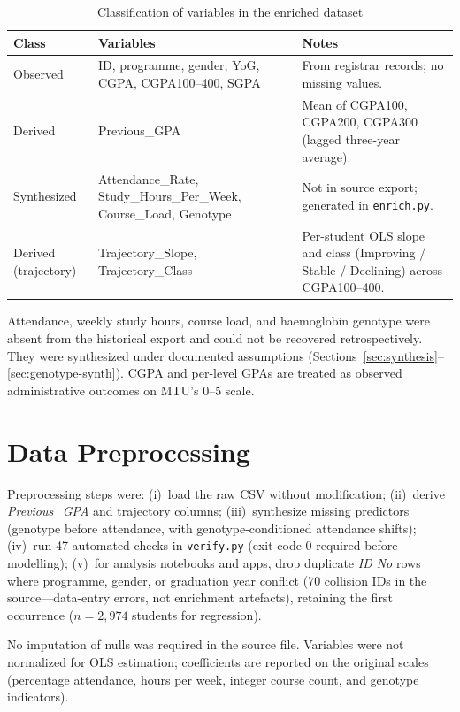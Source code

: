 \documentclass[12pt]{report}
\begin{document}
	\begin{table}[htbp]
		\centering
		\caption{Classification of variables in the enriched dataset}
		\label{tab:data-sources}
		\small
		\begin{tabularx}{\textwidth}{@{}>{\raggedright\arraybackslash}p{2.4cm} >{\raggedright\arraybackslash}p{4.6cm} >{\raggedright\arraybackslash}X@{}}
			\hline
			\textbf{Class} & \textbf{Variables} & \textbf{Notes} \\
			\hline
			Observed & ID, programme, gender, YoG, CGPA, CGPA100--400, SGPA & From registrar records; no missing values. \\
			Derived & Previous\_GPA & Mean of CGPA100, CGPA200, CGPA300 (lagged three-year average). \\
			Synthesized & Attendance\_Rate, Study\_Hours\_Per\_Week, Course\_Load, Genotype & Not in source export; generated in \texttt{enrich.py}. \\
			Derived (trajectory) & Trajectory\_Slope, Trajectory\_Class & Per-student OLS slope and class (Improving / Stable / Declining) across CGPA100--400. \\
			\hline
		\end{tabularx}
	\end{table}
	
	Attendance, weekly study hours, course load, and haemoglobin genotype were absent from the historical export and could not be recovered retrospectively. They were synthesized under documented assumptions (Sections~\ref{sec:synthesis}--\ref{sec:genotype-synth}). CGPA and per-level GPAs are treated as observed administrative outcomes on MTU's 0--5 scale.
	
	\section{Data Preprocessing}
	Preprocessing steps were: (i)~load the raw CSV without modification; (ii)~derive \textit{Previous\_GPA} and trajectory columns; (iii)~synthesize missing predictors (genotype before attendance, with genotype-conditioned attendance shifts); (iv)~run 47 automated checks in \texttt{verify.py} (exit code 0 required before modelling); (v)~for analysis notebooks and apps, drop duplicate \textit{ID No} rows where programme, gender, or graduation year conflict (70 collision IDs in the source---data-entry errors, not enrichment artefacts), retaining the first occurrence ($n = 2{,}974$ students for regression).
	
	No imputation of nulls was required in the source file. Variables were not normalized for OLS estimation; coefficients are reported on the original scales (percentage attendance, hours per week, integer course count, and genotype indicators).
	
\end{document}

